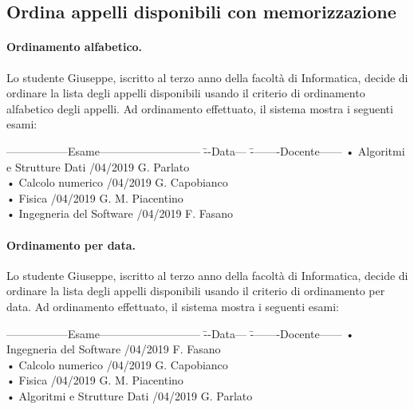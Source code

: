  
\subsection{Ordina appelli disponibili con memorizzazione}
\paragraph{Ordinamento alfabetico.}
Lo studente Giuseppe, iscritto al terzo anno della facoltà di Informatica, decide di ordinare la lista degli appelli disponibili usando il criterio di ordinamento alfabetico degli appelli. Ad ordinamento effettuato, il sistema mostra i seguenti esami:

\begin{tabbing}
	\hspace{1cm}-----------------Esame--------------------------- \= --Data--- \= --------Docente------ \kill
	\hspace{1cm} • Algoritmi e Strutture Dati /04/2019 \> G. Parlato \\
	\hspace{1cm} • Calcolo numerico /04/2019  \> G. Capobianco \\
	\hspace{1cm} • Fisica /04/2019 \> G. M. Piacentino  \\
	\hspace{1cm} • Ingegneria del Software /04/2019   \> F. Fasano \\
\end{tabbing}

\paragraph{Ordinamento per data.}
 Lo studente Giuseppe, iscritto al terzo anno della facoltà di Informatica, decide di ordinare la lista degli appelli disponibili usando il criterio di ordinamento per data. Ad ordinamento effettuato, il sistema mostra i seguenti esami:
 
\begin{tabbing}
	\hspace{1cm}-----------------Esame--------------------------- \= --Data--- \= --------Docente------ \kill
	\hspace{1cm} • Ingegneria del Software /04/2019   \> F. Fasano \\
	\hspace{1cm} • Calcolo numerico /04/2019  \> G. Capobianco \\
	\hspace{1cm} • Fisica /04/2019 \> G. M. Piacentino  \\
	\hspace{1cm} • Algoritmi e Strutture Dati /04/2019 \> G. Parlato \\
\end{tabbing} 

